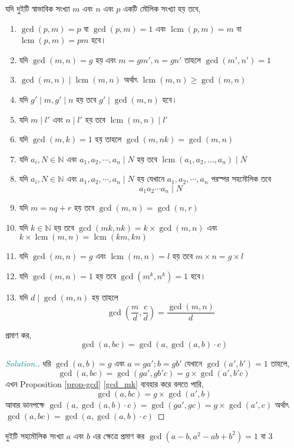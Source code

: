 \documentclass[a4paper,11pt]{article}
\DeclareMathOperator{\lcm}{lcm}
\newenvironment{sltn}{\begin{proof}[\emph{\textcolor{darkcyan}{Solution.}}]} {\end{proof}}
\begin{document}
\begin{prop}
	\label{prop-gcd}
	যদি দুইটি স্বাভাবিক সংখ্যা $m$ এবং $n$ এবং $p$ একটি মৌলিক সংখ্যা হয় তবে, 
	\begin{enumerate}[label=(\roman*),nosep]
		\item $\gcd(p,m)=p$ বা $\gcd(p,m)=1$ এবং $\lcm(p,m)=m$ বা $\lcm(p,m)=pm$ হবে।
		\item যদি $\gcd(m,n)=g$ হয় এবং $m=gm',n=gn'$ তাহলে $\gcd(m',n')=1$
		\item $\gcd(m,n) \mid \lcm(m,n)$ অর্থাৎ $\lcm(m,n) \geq \gcd(m,n)$
		\item যদি $g' \mid m, g' \mid n$ হয় তবে $g' \mid \gcd(m,n)$ হবে।
		\item যদি $m \mid l'$ এবং $n \mid l'$ হয় তবে $\lcm(m,n) \mid l'$
		\item যদি $\gcd(m,k)=1$ হয় তাহলে $\gcd(m,nk)=\gcd(m,n)$ \label{gcd_mk}
		\item যদি $a_i, N \in \mathbb{N}$ এবং $a_1, a_2, \cdots, a_n \mid N$ হয় তবে $\lcm(a_1, a_2, \dots, a_n) \mid N$
		\item যদি $a_i, N \in \mathbb{N}$ এবং $a_1, a_2, \cdots, a_n \mid N$ হয় যেখানে $a_1, a_2, \cdots, a_n$ পরস্পর সহমৌলিক তবে
		      \[a_1a_2\cdots a_n \mid N\]
		\item যদি $m=nq+r$ হয় তবে $\gcd(m,n)=\gcd(n,r)$ \label{Euclidean Algorithm}
		\item যদি $k \in \mathbb{N}$ হয় তবে $\gcd(mk,nk)=k\times \gcd(m,n)$ এবং $k\times \lcm(m,n)=\lcm(km,kn)$
		\item যদি $\gcd(m,n)=g$ এবং $\lcm(m,n)=l$ হয় তবে $m\times n=g\times l$
		\item যদি $\gcd(m,n)=1$ হয় তবে $\gcd(m^k, n^k)=1$ হবে।
		\item যদি $d\mid \gcd(m,n)$ হয় তাহলে
		      \[\gcd \left( \dfrac{m}{d}, \dfrac{c}{d}\right)=\dfrac{\gcd(m,n)}{d}\]
	\end{enumerate}
\end{prop}
\begin{xmpl}
	প্রমাণ কর,
	\[\gcd(a,bc)=\gcd(a,\gcd(a,b)\cdot c)\]
\end{xmpl}
\begin{sltn}
	ধরি $\gcd(a,b)=g$ এবং $a=ga';b=gb'$ যেখানে $\gcd(a',b')=1$ তাহলে, 
	\[\gcd(a,bc)=\gcd(ga',gb'c)=g\times \gcd(a',b'c) \]
	এখন Proposition \ref{prop-gcd} \ref{gcd_mk} ব্যবহার করে বলতে পারি, 
	\[\gcd(a,bc)=g\times \gcd(a',b)\]
	আবার ডানপক্ষে $\gcd(a,\gcd(a,b)\cdot c)=\gcd(ga',gc)=g\times \gcd(a',c)$
	অর্থাৎ $\gcd(a,bc)=\gcd(a,\gcd(a,b)\cdot c)$
\end{sltn}
\begin{xmpl}
	দুইটি সহমৌলিক সংখ্যা $a$ এবং $b$ এর ক্ষেত্রে প্রমাণ কর $\gcd(a-b, a^2-ab+b^2)=1$ বা $3$
\end{xmpl}
\end{document}
